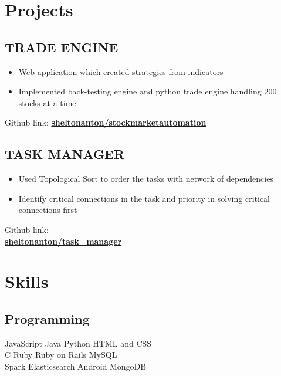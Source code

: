 \documentclass[]{deedy-resume-openfont}
\begin{document}
\begin{minipage}[t]{0.33\textwidth}
\section{Projects}
\subsection{TRADE ENGINE}
\begin{itemize}
\item Web application which created strategies from indicators
\item Implemented back-testing engine and python trade engine handling 200 stocks at a time
\end{itemize}
Github link: \href{https://github.com/sheltonanton/stockmarketautomation}{\bf sheltonanton/stockmarketautomation} \\
\sectionsep
\subsection{TASK MANAGER}
\begin{itemize}
    \item Used Topological Sort to order the tasks with network of dependencies
    \item Identify critical connections in the task and priority in solving critical connections first
\end{itemize}
Github link: \\
\href{https://github.com/sheltonanton/task_manager}{\bf sheltonanton/task\_manager} \\
\sectionsep


\section{Skills}
\subsection{Programming}
JavaScript \textbullet{}   Java \textbullet{} Python \textbullet{} HTML and CSS \\
C \textbullet{} Ruby \textbullet{} Ruby on Rails \textbullet{} MySQL \\
Spark \textbullet{} Elasticsearch \textbullet{} Android \textbullet{} MongoDB
\sectionsep

%
%

\end{minipage} 
\end{document}
